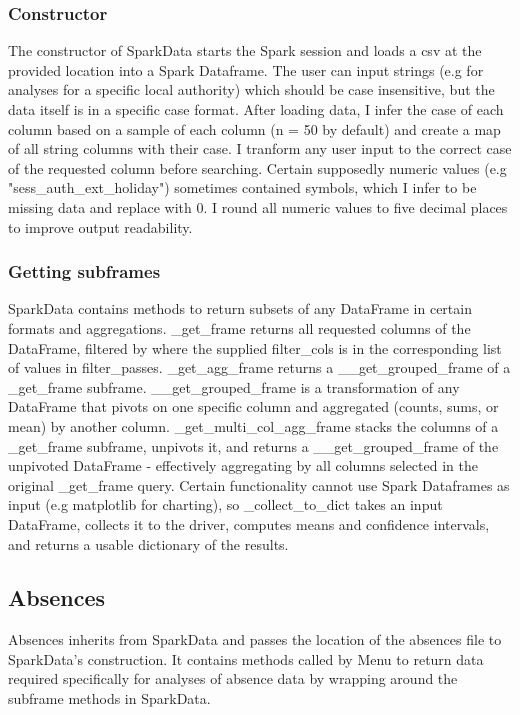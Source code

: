 \documentclass{article}
\begin{document}
        \subsubsection*{Constructor}
        The constructor of SparkData starts the Spark session and loads a csv at the provided location into a Spark Dataframe. The user can input strings (e.g for analyses for a specific local authority) which should be case insensitive, but the data itself is in a specific case format. After loading data, I infer the case of each column based on a sample of each column (n = 50 by default) and create a map of all string columns with their case. I tranform any user input to the correct case of the requested column before searching. Certain supposedly numeric values (e.g "sess\_auth\_ext\_holiday") sometimes contained symbols, which I infer to be missing data and replace with 0. I round all numeric values to five decimal places to improve output readability.
        \subsubsection*{Getting subframes}
        SparkData contains methods to return subsets of any DataFrame in certain formats and aggregations. 
        \_get\_frame returns all requested columns of the DataFrame, filtered by where the supplied filter\_cols is in the corresponding list of values in filter\_passes. 
    \_get\_agg\_frame returns a \_\_get\_grouped\_frame of a \_get\_frame subframe. \_\_get\_grouped\_frame is a transformation of any DataFrame that pivots on one specific column and aggregated (counts, sums, or mean) by another column. \_get\_multi\_col\_agg\_frame stacks the columns of a \_get\_frame subframe, unpivots it, and returns a \_\_get\_grouped\_frame of the unpivoted DataFrame - effectively aggregating by all columns selected in the original \_get\_frame query. 
        Certain functionality cannot use Spark Dataframes as input (e.g matplotlib for charting), so \_collect\_to\_dict takes an input DataFrame, collects it to the driver, computes means and confidence intervals, and returns a usable dictionary of the results. \\

    \subsection*{Absences}
    Absences inherits from SparkData and passes the location of the absences file to SparkData's construction. It contains methods called by Menu to return data required specifically for analyses of absence data by wrapping around the subframe methods in SparkData. 
\end{document}
